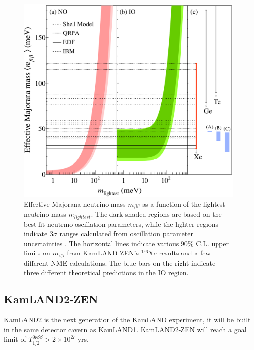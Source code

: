 \begin{figure}[htb]
	\centering
	\includegraphics[scale=0.35]{klz800_result.png}
	\caption{Effective Majorana neutrino mass $m_{\beta\beta}$ as a function of the lightest neutrino mass $m_{lightest}$. The dark shaded regions are based on the best-fit neutrino oscillation parameters, while the lighter regions indicate 3$\sigma$ ranges calculated from oscillation parameter uncertainties \cite{PhysRevD.90.033005} \cite{Nufit}. The horizontal lines indicate various 90\% C.L. upper limits on $m_{\beta\beta}$ from KamLAND-ZEN's $^{136}$Xe results and a few different NME calculations. The blue bars on the right indicate three different theoretical predictions in the IO region. \cite{klz800_arxiv}}
	\label{fig:klz800_result}
\end{figure}

\subsection{KamLAND2-ZEN}
KamLAND2 is the next generation of the KamLAND experiment, it will be built in the same detector cavern as KamLAND1. KamLAND2-ZEN will reach a goal limit of $T_{1/2}^{0\nu\beta\beta}>2\times 10^{27}$ yrs.

